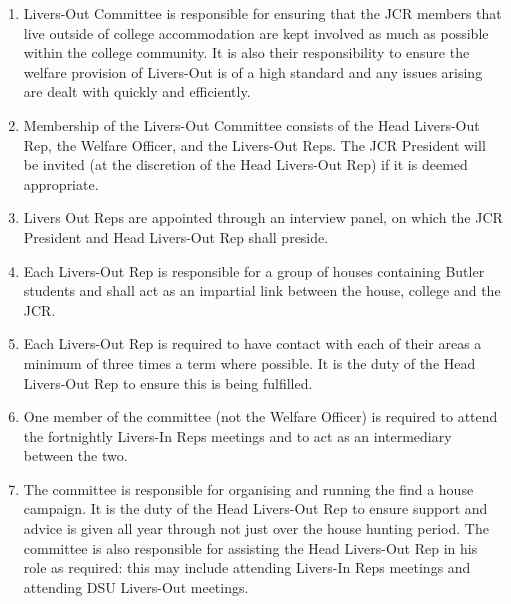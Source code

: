 \begin{enumerate}
    \item Livers-Out Committee is responsible for ensuring that the JCR members that live outside of college accommodation are kept involved as much as possible within the college community. It is also their responsibility to ensure the welfare provision of Livers-Out is of a high standard and any issues arising are dealt with quickly and efficiently.
    \item Membership of the Livers-Out Committee consists of the Head Livers-Out Rep, the Welfare Officer, and the Livers-Out Reps. The JCR President will be invited (at the discretion of the Head Livers-Out Rep) if it is deemed appropriate.
    \item Livers Out Reps are appointed through an interview panel, on which the JCR President and Head Livers-Out Rep shall preside.
    \item Each Livers-Out Rep is responsible for a group of houses containing Butler students and shall act as an impartial link between the house, college and the JCR.
    \item Each Livers-Out Rep is required to have contact with each of their areas a minimum of three times a term where possible. It is the duty of the Head Livers-Out Rep to ensure this is being fulfilled.
    \item One member of the committee (not the Welfare Officer) is required to attend the fortnightly Livers-In Reps meetings and to act as an intermediary between the two.
    \item The committee is responsible for organising and running the find a house campaign. It is the duty of the Head Livers-Out Rep to ensure support and advice is given all year through not just over the house hunting period. The committee is also responsible for assisting the Head Livers-Out Rep in his role as required: this may include attending Livers-In Reps meetings and attending DSU Livers-Out meetings.
\end{enumerate}



